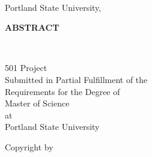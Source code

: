 
\frontmatter

\thispagestyle{empty}
\begin{center}
{\LARGE
{\bf\mythesistitle}
}
\vspace{.6in}

\myname \\
Portland State University, \myyear

\vspace{.6in}

{\large\bf ABSTRACT}
\end{center}



\newpage

\thispagestyle{empty}
\begin{center}
{\LARGE
{\bf\mythesistitle}
}
\vspace{.6in}

\myname

\vspace{.6in}

\degreetwo \\
\degreeone

\vfill
501 Project\\
Submitted in Partial Fulfillment of the \\
Requirements for the Degree of \\
Master of Science \\
at \\
Portland State University

\vspace{.25in}

\myyear

\end{center}
\newpage



\setcounter{page}{1}
\thispagestyle{empty}
\phantom{skip}
\vspace{.5in}
\begin{center}
Copyright by

\vspace{1in}
\myname

\vspace{4.5in}
\myyear
\end{center}
\newpage


